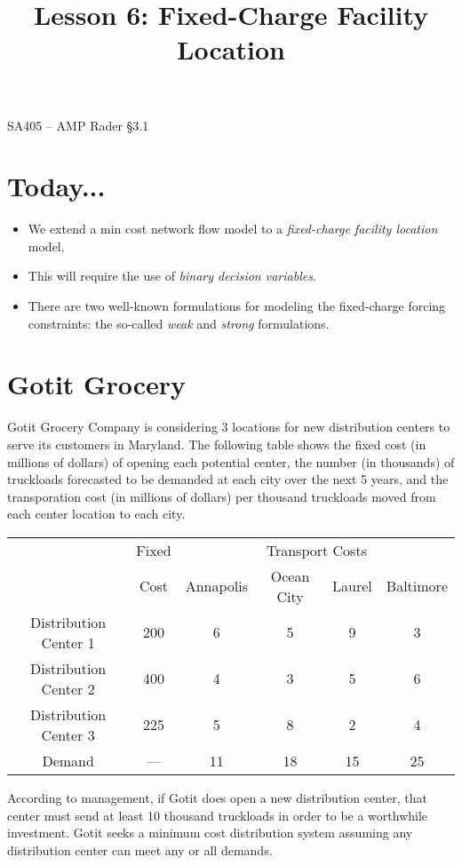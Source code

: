 \documentclass[11pt]{article}
\makeatletter
\theoremstyle{definition}
\renewcommand{\maketitle}{
  \noindent SA405 -- AMP \hfill Rader \S 3.1 \\

  \begin{center}\Large{\textbf{\@title}}\end{center}
}
\makeatother
\begin{document}
  
\title{Lesson 6: Fixed-Charge Facility Location}

\maketitle

\section{Today...}

\begin{itemize}
	\item  We extend a min cost network flow model to a \emph{fixed-charge facility location} model.
	\item  This will require the use of \emph{binary decision variables}.
	\item  There are two well-known formulations for modeling the fixed-charge forcing constraints:  the so-called \emph{weak} and \emph{strong} formulations.
\end{itemize}

\section{Gotit Grocery}
Gotit Grocery Company is considering 3 locations for new distribution centers to serve its customers in Maryland.  The following table shows the fixed cost (in millions of dollars) of opening each potential center, the number (in thousands) of truckloads forecasted to be demanded at each city over the next 5 years, and the transporation cost (in millions of dollars) per thousand truckloads moved from each center location to each city.  

\begin{center}
\begin{tabular}{c|c|cccc}
& Fixed & \multicolumn{4}{c}{Transport Costs} \\
& Cost & Annapolis & Ocean City & Laurel & Baltimore \\
\hline
Distribution Center 1 & 200 & 6 & 5 & 9 & 3  \\
Distribution Center 2 & 400 & 4 & 3 & 5 & 6 \\
Distribution Center 3 & 225 & 5 & 8 & 2 & 4 \\
\hline
Demand & --- & 11 & 18 & 15 & 25
\end{tabular}
\end{center}

According to management, if Gotit does open a new distribution center, that center must send at least 10 thousand truckloads in order to be a worthwhile investment. Gotit seeks a minimum cost distribution system assuming any distribution center can meet any or all demands.
\end{document}
